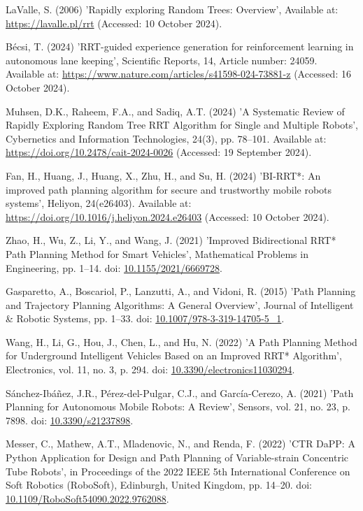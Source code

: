 \documentclass[a4paper,11pt]{report}
\begin{document}
\begin{thebibliography}{28}

     LaValle, S. (2006) 'Rapidly exploring Random Trees: Overview', Available at: \url{https://lavalle.pl/rrt} (Accessed: 10 October 2024).

     Bécsi, T. (2024) 'RRT-guided experience generation for reinforcement learning in autonomous lane keeping', Scientific Reports, 14, Article number: 24059. Available at: \url{https://www.nature.com/articles/s41598-024-73881-z} (Accessed: 16 October 2024).

     Muhsen, D.K., Raheem, F.A., and Sadiq, A.T. (2024) 'A Systematic Review of Rapidly Exploring Random Tree RRT Algorithm for Single and Multiple Robots', Cybernetics and Information Technologies, 24(3), pp. 78–101. Available at: \url{https://doi.org/10.2478/cait-2024-0026} (Accessed: 19 September 2024).

     Fan, H., Huang, J., Huang, X., Zhu, H., and Su, H. (2024) 'BI-RRT*: An improved path planning algorithm for secure and trustworthy mobile robots systems', Heliyon, 24(e26403). Available at: \url{https://doi.org/10.1016/j.heliyon.2024.e26403} (Accessed: 10 October 2024).

     Zhao, H., Wu, Z., Li, Y., and Wang, J. (2021) 'Improved Bidirectional RRT* Path Planning Method for Smart Vehicles', Mathematical Problems in Engineering, pp. 1–14. doi: \url{10.1155/2021/6669728}.

     Gasparetto, A., Boscariol, P., Lanzutti, A., and Vidoni, R. (2015) 'Path Planning and Trajectory Planning Algorithms: A General Overview', Journal of Intelligent \& Robotic Systems, pp. 1–33. doi: \url{10.1007/978-3-319-14705-5_1}.

     Wang, H., Li, G., Hou, J., Chen, L., and Hu, N. (2022) 'A Path Planning Method for Underground Intelligent Vehicles Based on an Improved RRT* Algorithm', Electronics, vol. 11, no. 3, p. 294. doi: \url{10.3390/electronics11030294}.

     Sánchez-Ibáñez, J.R., Pérez-del-Pulgar, C.J., and García-Cerezo, A. (2021) 'Path Planning for Autonomous Mobile Robots: A Review', Sensors, vol. 21, no. 23, p. 7898. doi: \url{10.3390/s21237898}.

     Messer, C., Mathew, A.T., Mladenovic, N., and Renda, F. (2022) 'CTR DaPP: A Python Application for Design and Path Planning of Variable-strain Concentric Tube Robots', in Proceedings of the 2022 IEEE 5th International Conference on Soft Robotics (RoboSoft), Edinburgh, United Kingdom, pp. 14–20. doi: \url{10.1109/RoboSoft54090.2022.9762088}.


\end{thebibliography}
\end{document}
